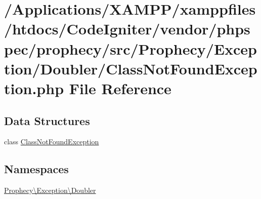 \hypertarget{_class_not_found_exception_8php}{}\section{/\+Applications/\+X\+A\+M\+P\+P/xamppfiles/htdocs/\+Code\+Igniter/vendor/phpspec/prophecy/src/\+Prophecy/\+Exception/\+Doubler/\+Class\+Not\+Found\+Exception.php File Reference}
\label{_class_not_found_exception_8php}
\subsection*{Data Structures}
\begin{DoxyCompactItemize}
\item 
class \mbox{\hyperlink{class_prophecy_1_1_exception_1_1_doubler_1_1_class_not_found_exception}{Class\+Not\+Found\+Exception}}
\end{DoxyCompactItemize}
\subsection*{Namespaces}
\begin{DoxyCompactItemize}
\item 
 \mbox{\hyperlink{namespace_prophecy_1_1_exception_1_1_doubler}{Prophecy\textbackslash{}\+Exception\textbackslash{}\+Doubler}}
\end{DoxyCompactItemize}
